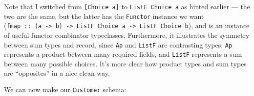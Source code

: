 \documentclass[]{article}
\newenvironment{Shaded}{}{}
\newcommand{\CommentTok}[1]{\textcolor[rgb]{0.38,0.63,0.69}{\textit{#1}}}
\newcommand{\DataTypeTok}[1]{\textcolor[rgb]{0.56,0.13,0.00}{#1}}
\newcommand{\NormalTok}[1]{#1}
\newcommand{\OperatorTok}[1]{\textcolor[rgb]{0.40,0.40,0.40}{#1}}
\newcommand{\OtherTok}[1]{\textcolor[rgb]{0.00,0.44,0.13}{#1}}
\newcommand{\StringTok}[1]{\textcolor[rgb]{0.25,0.44,0.63}{#1}}
\begin{document}
Note that I switched from \texttt{{[}Choice\ a{]}} to \texttt{ListF\ Choice\ a}
as hinted earlier --- the two are the same, but the latter has the
\texttt{Functor} instance we want
(\texttt{fmap\ ::\ (a\ -\textgreater{}\ b)\ -\textgreater{}\ ListF\ Choice\ a\ -\textgreater{}\ ListF\ Choice\ b}),
and is an instance of useful functor combinator typeclasses. Furthermore, it
illustrates the symmetry between sum types and record, since \texttt{Ap} and
\texttt{ListF} are contrasting types: \texttt{Ap} represents a product between
many required fields, and \texttt{ListF} represents a sum between many possible
choices. It's more clear how product types and sum types are ``opposites'' in a
nice clean way.

We can now make our \texttt{Customer} schema:

\begin{Shaded}
\end{Shaded}
\end{document}
